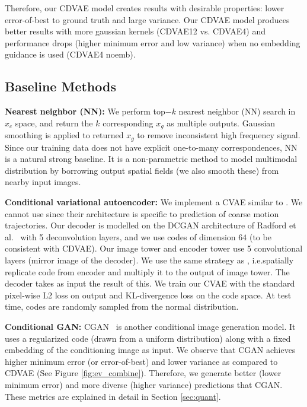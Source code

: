 \documentclass[10pt,twocolumn,letterpaper]{article}
\begin{document}
Therefore, our CDVAE model creates results with desirable properties: lower error-of-best 
to ground truth and large variance. Our CDVAE model produces better results with more 
gaussian kernels (CDVAE12 vs. CDVAE4) and performance drops (higher minimum error and 
low variance) when no embedding guidance is used (CDVAE4 noemb). 

\subsection{Baseline Methods}
\label{sec:baseline}

\textbf{Nearest neighbor (NN): } We perform top$-k$ nearest neighbor (NN) search in 
$x_c$ space, and return the $k$ corresponding $x_g$ as multiple outputs. Gaussian 
smoothing is applied to returned $x_g$ to remove inconsistent high frequency 
signal. Since our training data does not have explicit one-to-many correspondences, 
NN is a natural strong baseline. It is a non-parametric method to model multimodal
distribution by borrowing output spatial fields (we also smooth these) from nearby 
input images.

\textbf{Conditional variational autoencoder: } We implement a CVAE similar to 
\cite{walker2016uncertain}. We cannot use \cite{walker2016uncertain} since
their architecture is specific to prediction of coarse motion trajectories. 
Our decoder is modelled on the DCGAN architecture of Radford et al.~\cite{radford2015unsupervised} with
5 deconvolution layers, and we use codes of dimension $64$ (to be consistent
with CDVAE). Our image tower and encoder tower use 5 convolutional layers (mirror
image of the decoder). We use the same strategy as \cite{walker2016uncertain}, 
i.e.\we spatially replicate code from encoder and multiply it to the output of image
tower. The decoder takes as input the result of this. We train our CVAE with the standard 
pixel-wise L2 loss on output and KL-divergence loss on the code space. At test time, 
codes are randomly sampled from the normal distribution. 

\textbf{Conditional GAN:} CGAN~\cite{mirza2014conditional} is another conditional 
image generation model. It uses a regularized code (drawn from a uniform distribution) 
along with a fixed embedding of the conditioning image as input. We observe that
CGAN achieves higher minimum error (or error-of-best) and lower variance as 
compared to CDVAE (See Figure \ref{fig:ev_combine}). Therefore, we generate better 
(lower minimum error) and more diverse (higher variance) predictions that CGAN.
These metrics are explained in detail in Section \ref{sec:quant}.
\end{document}
